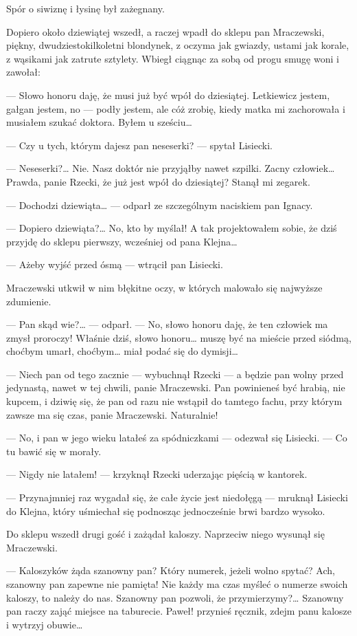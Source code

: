 \documentclass{book}
\begin{document}
Spór o siwiznę i łysinę był zażegnany.

Dopiero około dziewiątej wszedł, a raczej wpadł do sklepu pan Mraczewski, piękny, dwudziestokilkoletni blondynek, z oczyma jak gwiazdy, ustami jak korale, z wąsikami jak zatrute sztylety. Wbiegł ciągnąc za sobą od progu smugę woni i zawołał:

— Słowo honoru daję, że musi już być wpół do dziesiątej. Letkiewicz jestem, gałgan jestem, no — podły jestem, ale cóż zrobię, kiedy matka mi zachorowała i musiałem szukać doktora. Byłem u sześciu…

— Czy u tych, którym dajesz pan neseserki? — spytał Lisiecki.

— Neseserki?… Nie. Nasz doktór nie przyjąłby nawet szpilki. Zacny człowiek… Prawda, panie Rzecki, że już jest wpół do dziesiątej? Stanął mi zegarek.


— Dochodzi dziewiąta… — odparł ze szczególnym naciskiem pan Ignacy.

— Dopiero dziewiąta?… No, kto by myślał! A tak projektowałem sobie, że dziś przyjdę do sklepu pierwszy, wcześniej od pana Klejna…

— Ażeby wyjść przed ósmą — wtrącił pan Lisiecki.

Mraczewski utkwił w nim błękitne oczy, w których malowało się najwyższe zdumienie.

— Pan skąd wie?… — odparł. — No, słowo honoru daję, że ten człowiek ma zmysł proroczy! Właśnie dziś, słowo honoru… muszę być na mieście przed siódmą, choćbym umarł, choćbym… miał podać się do dymisji…

— Niech pan od tego zacznie — wybuchnął Rzecki — a będzie pan wolny przed jedynastą, nawet w tej chwili, panie Mraczewski. Pan powinieneś być hrabią, nie kupcem, i dziwię się, że pan od razu nie wstąpił do tamtego fachu, przy którym zawsze ma się czas, panie Mraczewski. Naturalnie!

— No, i pan w jego wieku latałeś za spódniczkami — odezwał się Lisiecki. — Co tu bawić się w morały.

— Nigdy nie latałem! — krzyknął Rzecki uderzając pięścią w kantorek.

— Przynajmniej raz wygadał się, że całe życie jest niedołęgą — mruknął Lisiecki do Klejna, który uśmiechał się podnosząc jednocześnie brwi bardzo wysoko.

Do sklepu wszedł drugi gość i zażądał kaloszy. Naprzeciw niego wysunął się Mraczewski.

— Kaloszyków żąda szanowny pan? Który numerek, jeżeli wolno spytać? Ach, szanowny pan zapewne nie pamięta! Nie każdy ma czas myśleć o numerze swoich kaloszy, to należy do nas. Szanowny pan pozwoli, że przymierzymy?… Szanowny pan raczy zająć miejsce na taburecie. Paweł! przynieś ręcznik, zdejm panu kalosze i wytrzyj obuwie…
\end{document}
